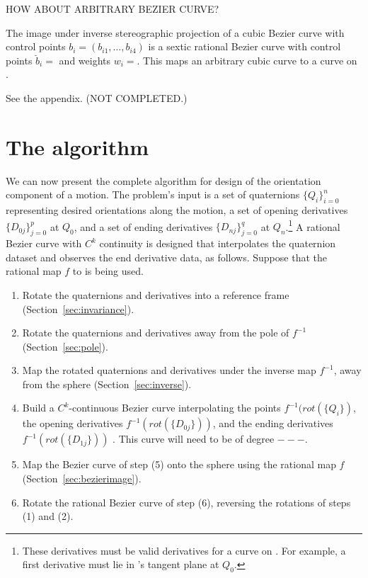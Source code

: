 \documentclass[12pt]{article}
\begin{document}
HOW ABOUT ARBITRARY BEZIER CURVE?

\begin{theorem}
\label{thm:imagesp}
The image under inverse stereographic projection 
of a cubic Bezier curve with control points $b_i = (b_{i1},\ldots,b_{i4})$
is a sextic rational Bezier curve 
with control points $\breve{b}_i = $ 
and weights $w_i = $.
This maps an arbitrary cubic curve to a curve on .
\end{theorem}
\prf 
See the appendix.  (NOT COMPLETED.)
\QED

\clearpage

\section{The algorithm}
\label{sec:alg}

We can now present the complete algorithm for design of the orientation
component of a motion.
The problem's input is a set of quaternions $\{Q_i\}_{i=0}^n$ 
representing desired orientations along the motion, 
a set of opening derivatives $\{D_{0j}\}_{j=0}^p$ at $Q_0$,
and a set of ending derivatives $\{D_{nj}\}_{j=0}^q$ at $Q_n$.\footnote{These derivatives 
   must be valid derivatives for a curve
   on .  For example, a first derivative must 
   lie in 's tangent plane at $Q_0$.}
A rational Bezier curve with $C^k$ continuity is designed that 
interpolates the quaternion dataset and observes the end derivative data, as follows.
Suppose that the rational map $f$ to  is being used.

\begin{enumerate}
\item Rotate the quaternions and derivatives into a reference frame 
      (Section~\ref{sec:invariance}).
\item Rotate the quaternions and derivatives away from the pole of $f^{-1}$
      (Section~\ref{sec:pole}).
\item Map the rotated quaternions and derivatives under the inverse map $f^{-1}$, 
      away from the sphere (Section~\ref{sec:inverse}).
\item Build a $C^k$-continuous Bezier curve interpolating the points
      $f^{-1}(rot(\{Q_i\})$, the opening derivatives $f^{-1}(rot(\{D_{0j}\}))$,
      and the ending derivatives $f^{-1}(rot(\{D_{1j}\}))$ \cite{farin02}.
      This curve will need to be of degree {\bf $---$}.
\item Map the Bezier curve of step (5) onto the sphere using the rational map $f$ 
      (Section~\ref{sec:bezierimage}).
\item Rotate the rational Bezier curve of step (6), reversing the rotations 
      of steps (1) and (2).
\end{enumerate}
\end{document}
